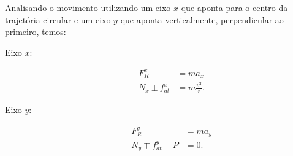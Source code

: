 Analisando o movimento utilizando um eixo $x$ que aponta para o centro da trajetória circular e um eixo $y$ que aponta verticalmente, perpendicular ao primeiro, temos:
\begin{description}
    \item[Eixo $x$:]
        \begin{align}
            F_R^x &= m a_x \\
            N_x \pm f_{at}^x &= m \frac{v^2}{r}.
        \end{align}
    \item[Eixo $y$:]
        \begin{align}
            F_R^y &= m a_y \\
            N_y \mp f_{at}^y - P &= 0.
        \end{align}
\end{description}

